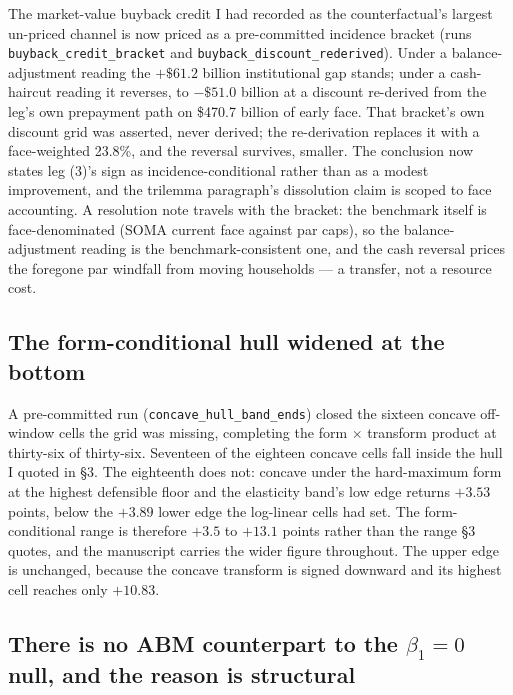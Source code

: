 \documentclass[11pt]{article}
\newcommand{\run}[1]{\texttt{#1}}
\begin{document}
The market-value buyback credit I had recorded as the counterfactual's largest
un-priced channel is now priced as a pre-committed incidence bracket (runs
\texttt{buyback\_credit\_bracket} and \texttt{buyback\_discount\_rederived}).
Under a balance-adjustment reading the $+\$61.2$ billion institutional gap
stands; under a cash-haircut reading it reverses, to $-\$51.0$ billion at a
discount re-derived from the leg's own prepayment path on \$470.7 billion of
early face. That bracket's own discount grid was asserted, never derived; the
re-derivation replaces it with a face-weighted 23.8\%, and the reversal
survives, smaller. The conclusion now states
leg (3)'s sign as incidence-conditional rather than as a modest improvement,
and the trilemma paragraph's dissolution claim is scoped to face accounting.
A resolution note travels with the bracket: the benchmark itself is
face-denominated (SOMA current face against par caps), so the
balance-adjustment reading is the benchmark-consistent one, and the cash
reversal prices the foregone par windfall from moving households --- a
transfer, not a resource cost.

\subsection{The form-conditional hull widened at the bottom}

A pre-committed run (\run{concave\_hull\_band\_ends}) closed the sixteen concave
off-window cells the grid was missing, completing the form $\times$ transform product
at thirty-six of thirty-six. Seventeen of the eighteen concave cells fall inside the
hull I quoted in \S3. The eighteenth does not: concave under the hard-maximum form at
the highest defensible floor and the elasticity band's low edge returns $+3.53$
points, below the $+3.89$ lower edge the log-linear cells had set. The
form-conditional range is therefore $+3.5$ to $+13.1$ points rather than the range
\S3 quotes, and the manuscript carries the wider figure throughout. The upper edge is unchanged,
because the concave transform is signed downward and its highest cell reaches only
$+10.83$.

\subsection{There is no ABM counterpart to the $\beta_1 = 0$ null, and the reason is
structural}
\end{document}
